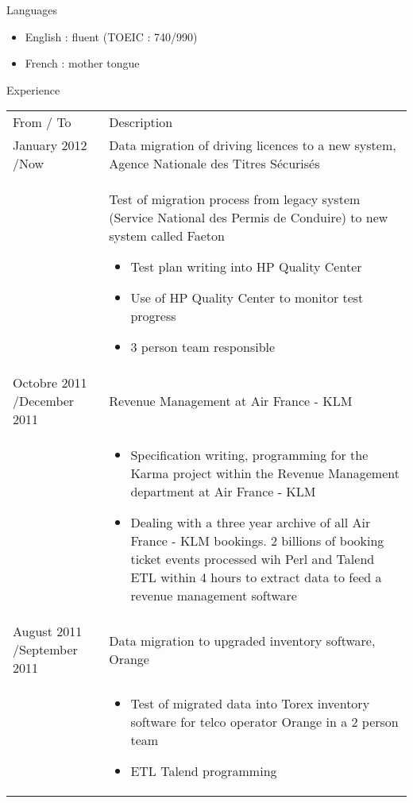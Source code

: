 \documentclass[a4paper,11pt]{letter}
\begin{document}
Languages
\begin{itemize}
\item    English : fluent (TOEIC : 740/990)
\item    French : mother tongue
\end{itemize}

Experience

\begin{tabular}{p{}p{}}
From / To & Description \\
January 2012 \slash Now & Data migration of driving licences to a new system, Agence Nationale des Titres Sécuris\'es \\
	

 & Test of migration process from legacy system (Service National des Permis de Conduire) to new system called Faeton 
\begin{itemize}
\item Test plan writing into HP Quality Center
\item Use of HP Quality Center to monitor test progress
\item 3 person team responsible
\end{itemize} \\
	

Octobre 2011 \slash December 2011 & Revenue Management at Air France - KLM \\

     & 
\begin{itemize}
\item Specification writing, programming for the Karma project within the Revenue Management department at Air France - KLM

\item Dealing with a three year archive of all Air France - KLM bookings. 2 billions of booking ticket events processed wih Perl and Talend ETL within 4 hours to extract data to feed a revenue management software
\end{itemize} \\
	

August 2011 \slash September 2011 & Data migration to upgraded inventory software, Orange \\
& \begin{itemize}
\item Test of migrated data into Torex inventory software for telco operator Orange in a 2 person team
\item ETL Talend programming
\end{itemize} \\


\end{tabular}
\end{document}

